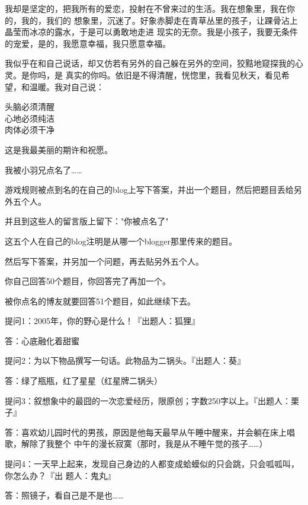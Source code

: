 		我却是坚定的，把我所有的爱恋，投射在不曾来过的生活。我在想象里，我在你的，我的，我们的
	想象里，沉迷了。好象赤脚走在青草丛里的孩子，让踝骨沾上晶莹而冰凉的露水，于是可以勇敢地走进
	现实的无奈。我是小孩子，我要无条件的宠爱，是的，我愿意幸福，我只愿意幸福。

		我似乎在和自己说话，却又仿若有另外的自己躲在另外的空间，狡黠地窥探我的心灵。是你吗，是
	真实的你吗。依旧是不得清醒，恍惚里，我看见秋天，看见希望，和温暖。我对自己说：

		\longpoem{}{}{}
			头脑必须清醒 \\
			心地必须纯洁 \\
			肉体必须干净
		\endlongpoem

		这是我最美丽的期许和祝愿。

	\endwriting



		我被小羽兄点名了……

		游戏规则被点到名的在自己的blog上写下答案，并出一个题目，然后把题目丢给另外五个人。\par
		并且到这些人的留言版上留下："你被点名了"\par
		这五个人在自己的blog注明是从哪一个blogger那里传来的题目。\par
		然后写下答案，并另加一个问题，再去贴另外五个人。\par
		你自己回答50个题目，你回答完了再加一个。\par
		被你点名的博友就要回答51个题目，如此继续下去。

		\vspace{1em}
		提问1：2005年，你的野心是什么！『出题人：狐狸』\par
		答：心底融化着甜蜜

		\vspace{1em}
		提问2：为以下物品撰写一句话。此物品为二锅头。『出题人：葵』\par
		答：绿了瓶瓶，红了星星（红星牌二锅头）

		\vspace{1em}
		提问3：叙想象中的最囧的一次恋爱经历，限原创；字数250字以上。『出题人：栗子』\par
		答：喜欢幼儿园时代的男孩，原因是他每天最早从午睡中醒来，并会躺在床上唱歌，解除了我整个
			中午的漫长寂寞（那时，我是从不睡午觉的孩子……）

		\vspace{1em}
		提问4：一天早上起来，发现自己身边的人都变成蛤蟆似的只会跳，只会呱呱叫，你怎么办？『出
				题人：鬼丸』\par
		答：照镜子，看自己是不是也……

